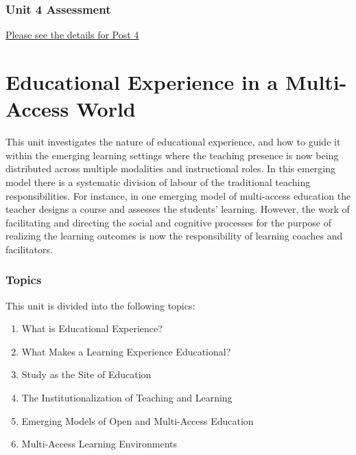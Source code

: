 \documentclass[
]{book}
\providecommand{\tightlist}{%
  \setlength{\itemsep}{0pt}\setlength{\parskip}{0pt}}
\begin{document}
\hypertarget{unit-4-assessment-1}{%
\subsection*{Unit 4 Assessment}\label{unit-4-assessment-1}}

\href{https://ma-lead.github.io/ldrs663/assessments.html\#post-4}{Please see the details for Post 4}

\hypertarget{educational-experience-in-a-multi-access-world}{%
\chapter{Educational Experience in a Multi-Access World}\label{educational-experience-in-a-multi-access-world}}

This unit investigates the nature of educational experience, and how to guide it within the emerging learning settings where the teaching presence is now being distributed across multiple modalities and instructional roles. In this emerging model there is a systematic division of labour of the traditional teaching responsibilities. For instance, in one emerging model of multi-access education the teacher designs a course and assesses the students' learning. However, the work of facilitating and directing the social and cognitive processes for the purpose of realizing the learning outcomes is now the responsibility of learning coaches and facilitators.

\hypertarget{topics-4}{%
\subsection*{Topics}\label{topics-4}}

This unit is divided into the following topics:

\begin{enumerate}
\def\labelenumi{\arabic{enumi}.}
\tightlist
\item
  What is Educational Experience?
\item
  What Makes a Learning Experience Educational?
\item
  Study as the Site of Education
\item
  The Institutionalization of Teaching and Learning
\item
  Emerging Models of Open and Multi-Access Education
\item
  Multi-Access Learning Environments
\end{enumerate}
\end{document}
